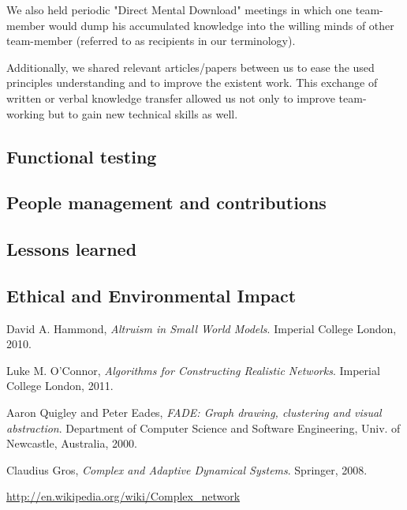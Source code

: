 \documentclass[a4paper,11pt,titlepage]{article}
\begin{document}
We also held periodic "Direct Mental Download" meetings in which one
team-member would dump his accumulated knowledge into the willing
minds of other team-member (referred to as recipients in our terminology).

Additionally, we shared relevant articles/papers between us to ease
the used principles understanding and to improve the existent work.
This exchange of written or verbal knowledge transfer allowed us not
only to improve team-working but to gain new technical skills as well.



\subsection{Functional testing}
\label{tests}




\subsection{People management and contributions}

\subsection{Lessons learned}


\subsection{Ethical and Environmental Impact}

\begin{thebibliography}{9}

  David A. Hammond,
  \emph{Altruism in Small World Models}.
  Imperial College London,
  2010.

  Luke M. O'Connor,
  \emph{Algorithms for Constructing Realistic Networks}.
  Imperial College London,
  2011.

  Aaron Quigley and Peter Eades,
  \emph{FADE: Graph drawing, clustering and visual abstraction}.
  Department of Computer Science and Software Engineering,
  Univ. of  Newcastle, Australia, 2000.

Claudius Gros,
\emph{Complex and Adaptive Dynamical Systems}.
Springer,
2008.

  \url{http://en.wikipedia.org/wiki/Complex_network}

\end{thebibliography}
\end{document}
